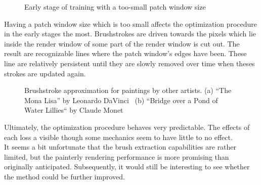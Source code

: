 \begin{figure*}[!htb]
    \caption[]{Early stage of training with a too-small patch window size}
\end{figure*}
Having a patch window size which is too small affects the optimization procedure in the early stages the most.
Brushstrokes are driven towards the pixels which lie inside the render window of some part of the render window is cut out.
The result are recognizable lines where the patch window's edges have been.
These line are relatively persistent until they are slowly removed over time when theses strokes are updated again. 

\begin{figure*}[!htb]
    \caption[]{Brushstroke approximation for paintings by other artists. (a) ``The Mona Lisa'' by Leonardo DaVinci~\cite{monalisa} (b) ``Bridge over a Pond of Water Lillies`` by Claude Monet~\cite{bridge}}
\end{figure*}


Ultimately, the optimization procedure behaves very predictable.
The effects of each loss a visible though some mechanics seem to have little to no effect.\\
It seems a bit unfortunate that the brush extraction capabilities are rather limited, but the painterly rendering performance is more promising than originally anticipated.
Subsequently, it would still be interesting to see whether the method could be further improved.

